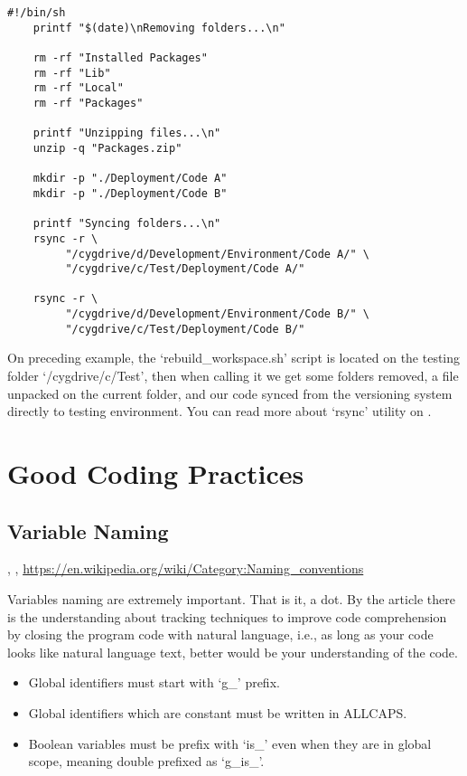     \begin{lstlisting}[caption={rebuild\_workspace.sh}]
    #!/bin/sh
    printf "$(date)\nRemoving folders...\n"

    rm -rf "Installed Packages"
    rm -rf "Lib"
    rm -rf "Local"
    rm -rf "Packages"

    printf "Unzipping files...\n"
    unzip -q "Packages.zip"

    mkdir -p "./Deployment/Code A"
    mkdir -p "./Deployment/Code B"

    printf "Syncing folders...\n"
    rsync -r \
         "/cygdrive/d/Development/Environment/Code A/" \
         "/cygdrive/c/Test/Deployment/Code A/"

    rsync -r \
         "/cygdrive/d/Development/Environment/Code B/" \
         "/cygdrive/c/Test/Deployment/Code B/"
    \end{lstlisting}
    \vspace*{-4mm}

    On preceding example, the `rebuild\_workspace.sh' script is located on the
    testing folder `/cygdrive/c/Test', then when calling it we get some folders
    removed, a file unpacked on the current folder, and our code synced from the
    versioning system directly to testing environment. You can read more about
    `rsync' utility on \citeonline{synchronizingFolders}.



    \section{Good Coding Practices}


    \subsection{Variable Naming}

    \cite{theImpactOfIdentifierStyle},
    \cite{womenAndMen},
    \url{https://en.wikipedia.org/wiki/Category:Naming_conventions}

    Variables naming are extremely important. That is it, a dot. By the article
     there is the understanding about tracking
    techniques to improve code comprehension by closing the program code with
    natural language, i.e., as long as your code looks like natural language
    text, better would be your understanding of the code.

    \begin{itemize}
        \item Global identifiers must start with `g\_' prefix.
        \item Global identifiers which are constant must be written in ALLCAPS.
        \item Boolean variables must be prefix with `is\_' even when they are in
              global scope, meaning double prefixed as `g\_is\_'.
    \end{itemize}

